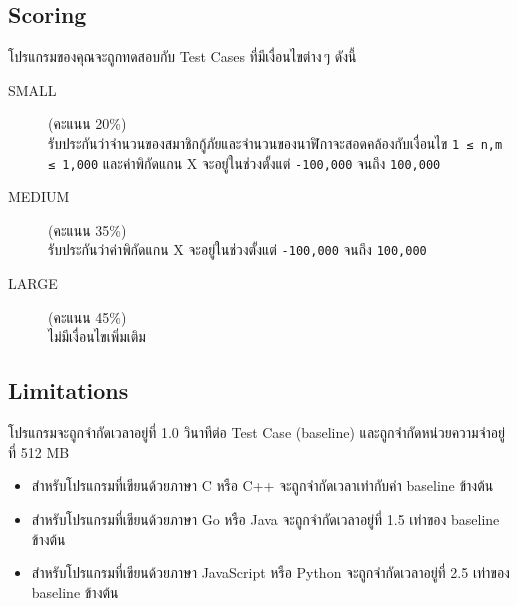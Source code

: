 \subsection{Scoring}

\noindent
โปรแกรมของคุณจะถูกทดสอบกับ Test Cases ที่มีเงื่อนไขต่าง\,ๆ ดังนี้

\begin{description}
    \item[SMALL] (คะแนน 20\%) \\
        รับประกันว่าจำนวนของสมาชิกกู้ภัยและจำนวนของนาฬิกาจะสอดคล้องกับเงื่อนไข \lstinline{1 ≤ n,m ≤ 1,000} และค่าพิกัดแกน X จะอยู่ในช่วงตั้งแต่ \lstinline{-100,000} จนถึง \lstinline{100,000}
    \item[MEDIUM] (คะแนน 35\%) \\
        รับประกันว่าค่าพิกัดแกน X จะอยู่ในช่วงตั้งแต่ \lstinline{-100,000} จนถึง \lstinline{100,000}
    \item[LARGE] (คะแนน 45\%) \\
        ไม่มีเงื่อนไขเพิ่มเติม
\end{description}


\subsection{Limitations}

\noindent
โปรแกรมจะถูกจำกัดเวลาอยู่ที่ 1.0 วินาทีต่อ Test Case (baseline) และถูกจำกัดหน่วยความจำอยู่ที่ 512 MB
\begin{itemize}
    \item 
        สำหรับโปรแกรมที่เขียนด้วยภาษา C หรือ C++ จะถูกจำกัดเวลาเท่ากับค่า baseline ข้างต้น
    \item 
        สำหรับโปรแกรมที่เขียนด้วยภาษา Go หรือ Java จะถูกจำกัดเวลาอยู่ที่ 1.5 เท่าของ baseline ข้างต้น
    \item 
        สำหรับโปรแกรมที่เขียนด้วยภาษา JavaScript หรือ Python จะถูกจำกัดเวลาอยู่ที่ 2.5 เท่าของ baseline ข้างต้น
\end{itemize}
